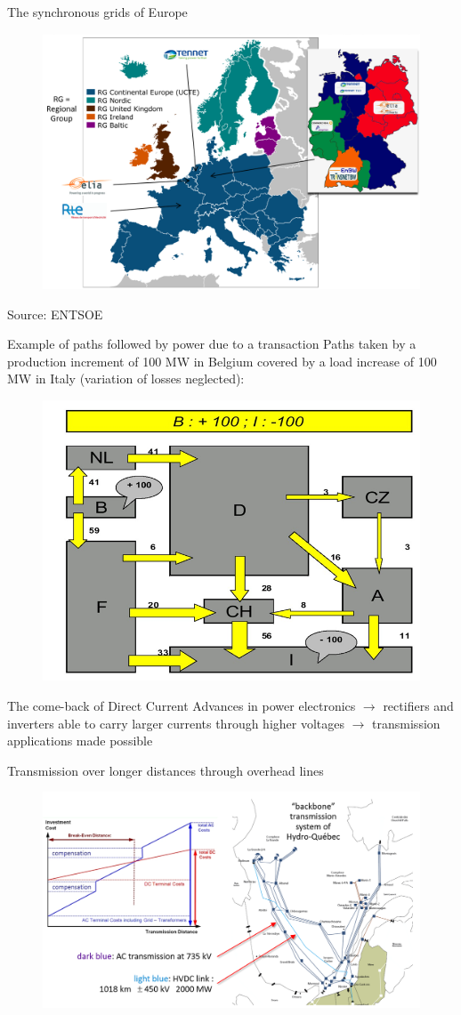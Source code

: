 \begin{frame}
{The synchronous grids of Europe}
\begin{figure}
\centering
\includegraphics[width=0.6\linewidth]{images/EU_TSOs.png}
\end{figure}
\vfill
\footnotesize{Source: ENTSOE}
\end{frame}

\begin{frame}
{Example of paths followed by power due to a transaction}
Paths taken by a production increment of 100 MW in Belgium
covered by a load increase of 100 MW in Italy (variation of losses neglected):
\begin{figure}
\centering
\includegraphics[width=0.4\linewidth]{images/EU_path_flows.png}
\end{figure}
\end{frame}

\begin{frame}
{The come-back of Direct Current}
Advances in power electronics $\rightarrow$ rectifiers and inverters able to carry larger currents through higher voltages $\rightarrow$ transmission applications made possible
\end{frame}

\begin{frame}{Transmission over longer distances through overhead lines}
\begin{figure}
\centering
\includegraphics[width=0.6\linewidth]{images/DC_line.png}
\end{figure}
\end{frame}

